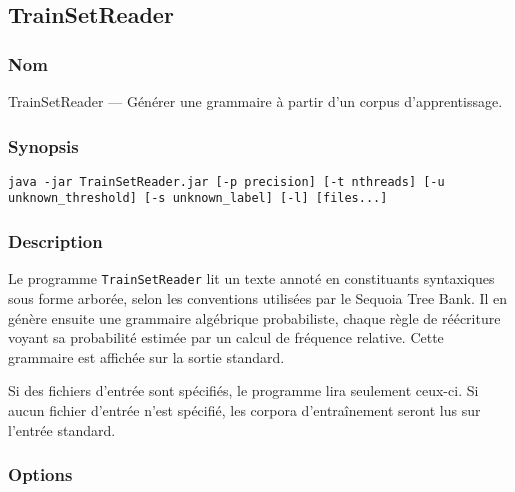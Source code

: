 \documentclass[12pt]{article}
\begin{document}
\subsection{TrainSetReader}
\subsubsection{Nom}

TrainSetReader --- G\'en\'erer une grammaire \`a partir d'un corpus d'apprentissage.

\subsubsection{Synopsis}

{\ttfamily
\begin{verbatim}
java -jar TrainSetReader.jar [-p precision] [-t nthreads] [-u
unknown_threshold] [-s unknown_label] [-l] [files...]
\end{verbatim}
}

\subsubsection{Description}

Le programme \texttt{TrainSetReader} lit un texte annot\'e en constituants
syntaxiques sous forme arbor\'ee, selon les conventions utilis\'ees par le Sequoia Tree Bank. Il en
g\'en\`ere ensuite une grammaire alg\'ebrique probabiliste, chaque r\`egle de r\'e\'ecriture
voyant sa probabilit\'e estim\'ee par un calcul de fr\'equence relative. Cette
grammaire est affich\'ee sur la sortie standard.

Si des fichiers d'entr\'ee sont sp\'ecifi\'es, le programme lira seulement ceux-ci. Si
aucun fichier d'entr\'ee n'est sp\'ecifi\'e, les corpora d'entra\^inement seront lus sur
l'entr\'ee standard.

\subsubsection{Options}
\end{document}

